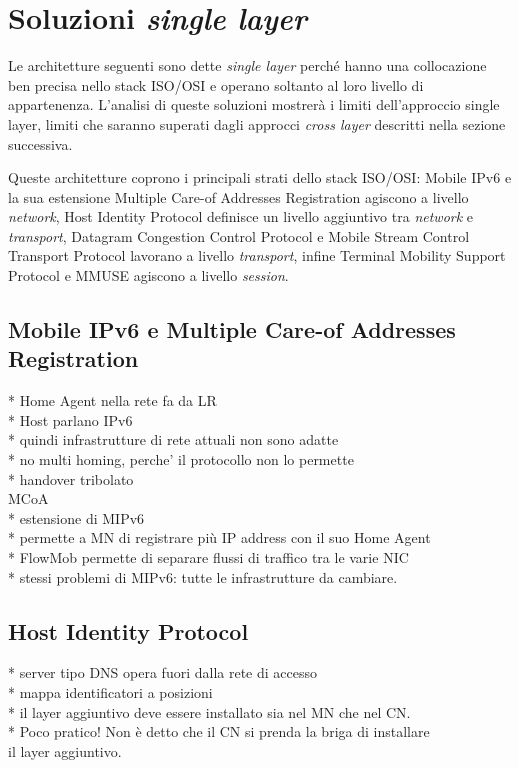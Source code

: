 \documentclass[12pt,a4paper,openright,twoside]{book}
\begin{document}
\section{Soluzioni \emph{single layer}}
Le architetture seguenti sono dette \emph{single layer} perché hanno
una collocazione ben precisa nello stack ISO/OSI e operano soltanto al
loro livello di appartenenza. L'analisi di queste soluzioni mostrerà i
limiti dell'approccio single layer, limiti che saranno superati dagli
approcci \emph{cross layer} descritti nella sezione successiva.

Queste architetture coprono i principali strati dello stack ISO/OSI:
Mobile IPv6 \cite{bib:mipv6} e la sua estensione Multiple Care-of
Addresses Registration \cite{bib:mcoa} agiscono a livello
\emph{network}, Host Identity Protocol \cite{bib:hip} definisce un
livello aggiuntivo tra \emph{network} e \emph{transport}, Datagram
Congestion Control Protocol \cite{bib:dccp} e Mobile Stream Control
Transport Protocol \cite{bib:m-sctp} lavorano a livello
\emph{transport}, infine Terminal Mobility Support Protocol
\cite{bib:tmsp} e MMUSE \cite{bib:mmuse} agiscono a livello
\emph{session}.

\subsection{Mobile IPv6 e Multiple Care-of Addresses Registration}
* Home Agent nella rete fa da LR\\
* Host parlano IPv6\\
* quindi infrastrutture di rete attuali non sono adatte\\
* no multi homing, perche' il protocollo non lo permette\\
* handover tribolato\\
MCoA\\
* estensione di MIPv6\\
* permette a MN di registrare più IP address con il suo Home Agent\\
* FlowMob permette di separare flussi di traffico tra le varie NIC\\
* stessi problemi di MIPv6: tutte le infrastrutture da cambiare.

\subsection{Host Identity Protocol}
* server tipo DNS opera fuori dalla rete di accesso\\
* mappa identificatori a posizioni\\
* il layer aggiuntivo deve essere installato sia nel MN che nel
  CN.\\
* Poco pratico! Non è detto che il CN si prenda la briga di installare\\
  il layer aggiuntivo.\\
\end{document}
